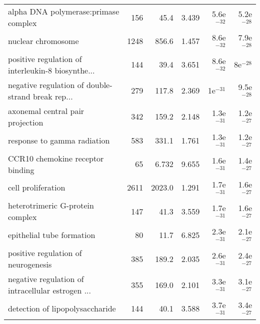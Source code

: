 \begin{longtable}{lrrrrr}
              alpha DNA polymerase:primase complex &                     156 &                    45.4 &      3.439 &         5.6e$^{-32}$ &         5.2e$^{-28}$ \\
                                nuclear chromosome &                    1248 &                   856.6 &      1.457 &         8.6e$^{-32}$ &         7.9e$^{-28}$ \\
 positive regulation of interleukin-8 biosynthe... &                     144 &                    39.4 &      3.651 &         8.6e$^{-32}$ &           8e$^{-28}$ \\
 negative regulation of double-strand break rep... &                     279 &                   117.8 &      2.369 &           1e$^{-31}$ &         9.5e$^{-28}$ \\
                  axonemal central pair projection &                     342 &                   159.2 &      2.148 &         1.3e$^{-31}$ &         1.2e$^{-27}$ \\
                       response to gamma radiation &                     583 &                   331.1 &      1.761 &         1.3e$^{-31}$ &         1.2e$^{-27}$ \\
                  CCR10 chemokine receptor binding &                      65 &                   6.732 &      9.655 &         1.6e$^{-31}$ &         1.4e$^{-27}$ \\
                                cell proliferation &                    2611 &                  2023.0 &      1.291 &         1.7e$^{-31}$ &         1.6e$^{-27}$ \\
                  heterotrimeric G-protein complex &                     147 &                    41.3 &      3.559 &         1.7e$^{-31}$ &         1.6e$^{-27}$ \\
                         epithelial tube formation &                      80 &                    11.7 &      6.825 &         2.3e$^{-31}$ &         2.1e$^{-27}$ \\
               positive regulation of neurogenesis &                     385 &                   189.2 &      2.035 &         2.6e$^{-31}$ &         2.4e$^{-27}$ \\
 negative regulation of intracellular estrogen ... &                     355 &                   169.0 &      2.101 &         3.3e$^{-31}$ &         3.1e$^{-27}$ \\
                   detection of lipopolysaccharide &                     144 &                    40.1 &      3.588 &         3.7e$^{-31}$ &         3.4e$^{-27}$ \\

\end{longtable}
